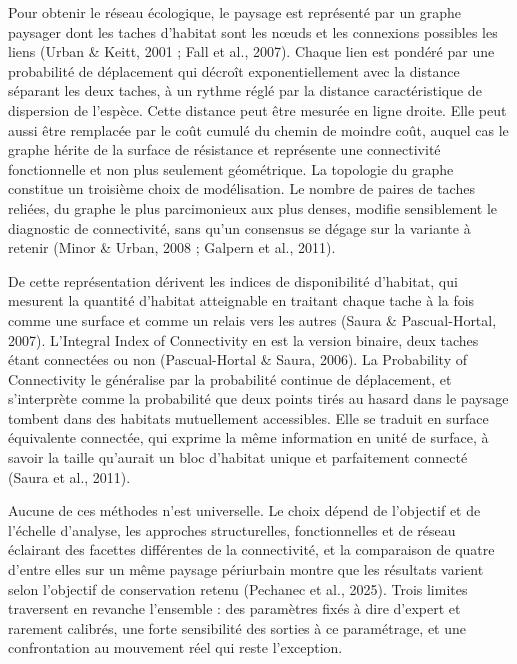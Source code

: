 \documentclass[a4paper,12pt]{report}
\begin{document}
Pour obtenir le réseau écologique, le paysage est représenté par un graphe paysager dont les taches d'habitat sont les nœuds et les connexions possibles les liens (Urban \& Keitt, 2001 ; Fall et al., 2007). Chaque lien est pondéré par une probabilité de déplacement qui décroît exponentiellement avec la distance séparant les deux taches, à un rythme réglé par la distance caractéristique de dispersion de l'espèce. Cette distance peut être mesurée en ligne droite. Elle peut aussi être remplacée par le coût cumulé du chemin de moindre coût, auquel cas le graphe hérite de la surface de résistance et représente une connectivité fonctionnelle et non plus seulement géométrique. La topologie du graphe constitue un troisième choix de modélisation. Le nombre de paires de taches reliées, du graphe le plus parcimonieux aux plus denses, modifie sensiblement le diagnostic de connectivité, sans qu'un consensus se dégage sur la variante à retenir (Minor \& Urban, 2008 ; Galpern et al., 2011).

De cette représentation dérivent les indices de disponibilité d'habitat, qui mesurent la quantité d'habitat atteignable en traitant chaque tache à la fois comme une surface et comme un relais vers les autres (Saura \& Pascual-Hortal, 2007). L'Integral Index of Connectivity en est la version binaire, deux taches étant connectées ou non (Pascual-Hortal \& Saura, 2006). La Probability of Connectivity le généralise par la probabilité continue de déplacement, et s'interprète comme la probabilité que deux points tirés au hasard dans le paysage tombent dans des habitats mutuellement accessibles. Elle se traduit en surface équivalente connectée, qui exprime la même information en unité de surface, à savoir la taille qu'aurait un bloc d'habitat unique et parfaitement connecté (Saura et al., 2011).

Aucune de ces méthodes n'est universelle. Le choix dépend de l'objectif et de l'échelle d'analyse, les approches structurelles, fonctionnelles et de réseau éclairant des facettes différentes de la connectivité, et la comparaison de quatre d'entre elles sur un même paysage périurbain montre que les résultats varient selon l'objectif de conservation retenu (Pechanec et al., 2025). Trois limites traversent en revanche l'ensemble : des paramètres fixés à dire d'expert et rarement calibrés, une forte sensibilité des sorties à ce paramétrage, et une confrontation au mouvement réel qui reste l'exception.
\end{document}
